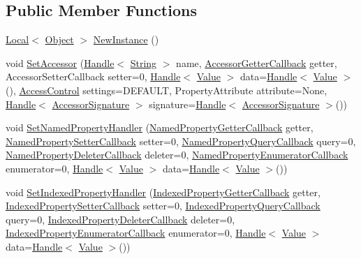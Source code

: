 \subsection*{Public Member Functions}
\begin{DoxyCompactItemize}
\item 
\hyperlink{classv8_1_1_local}{Local}$<$ \hyperlink{classv8_1_1_object}{Object} $>$ \hyperlink{classv8_1_1_object_template_ad25d8ebf37b1a3aaf7d4a03b1a9bd5c1}{New\+Instance} ()
\item 
void \hyperlink{classv8_1_1_object_template_acf245fcdedc797068a1eb4c8d46a5269}{Set\+Accessor} (\hyperlink{classv8_1_1_handle}{Handle}$<$ \hyperlink{classv8_1_1_string}{String} $>$ name, \hyperlink{namespacev8_a722613c87061708a4f1aa050d095f868}{Accessor\+Getter\+Callback} getter, Accessor\+Setter\+Callback setter=0, \hyperlink{classv8_1_1_handle}{Handle}$<$ \hyperlink{classv8_1_1_value}{Value} $>$ data=\hyperlink{classv8_1_1_handle}{Handle}$<$ \hyperlink{classv8_1_1_value}{Value} $>$(), \hyperlink{namespacev8_a31d8355cb043d7d2dda3f4a52760b64e}{Access\+Control} settings=D\+E\+F\+A\+U\+L\+T, Property\+Attribute attribute=None, \hyperlink{classv8_1_1_handle}{Handle}$<$ \hyperlink{classv8_1_1_accessor_signature}{Accessor\+Signature} $>$ signature=\hyperlink{classv8_1_1_handle}{Handle}$<$ \hyperlink{classv8_1_1_accessor_signature}{Accessor\+Signature} $>$())
\item 
void \hyperlink{classv8_1_1_object_template_ac7bcbb6e2936ab38490680f7e1bfb787}{Set\+Named\+Property\+Handler} (\hyperlink{namespacev8_a50cae386a68bf9ff23d02aa1161face4}{Named\+Property\+Getter\+Callback} getter, \hyperlink{namespacev8_a9587769513971dc7cb301b740d9e66b6}{Named\+Property\+Setter\+Callback} setter=0, \hyperlink{namespacev8_ac135beae5f0c8b290255accb438f990e}{Named\+Property\+Query\+Callback} query=0, \hyperlink{namespacev8_aaba861076c5b111912cfa0791d348437}{Named\+Property\+Deleter\+Callback} deleter=0, \hyperlink{namespacev8_a5f6f16818a9cddacadbfe6d90ca3a6b1}{Named\+Property\+Enumerator\+Callback} enumerator=0, \hyperlink{classv8_1_1_handle}{Handle}$<$ \hyperlink{classv8_1_1_value}{Value} $>$ data=\hyperlink{classv8_1_1_handle}{Handle}$<$ \hyperlink{classv8_1_1_value}{Value} $>$())
\item 
void \hyperlink{classv8_1_1_object_template_a5542f9cf400563a8c2fda448144feee1}{Set\+Indexed\+Property\+Handler} (\hyperlink{namespacev8_a48e7816ba64447bf32a25d194588daaf}{Indexed\+Property\+Getter\+Callback} getter, \hyperlink{namespacev8_a4ac7cc6185ebc8b6a199f9fa8e6bf5c3}{Indexed\+Property\+Setter\+Callback} setter=0, \hyperlink{namespacev8_a980b62c33eb664783e61e25c3b27f9ee}{Indexed\+Property\+Query\+Callback} query=0, \hyperlink{namespacev8_a53863728de14cde48dd6543207b2f2da}{Indexed\+Property\+Deleter\+Callback} deleter=0, \hyperlink{namespacev8_adbb0a6d5537371953f9ba807d4f6275e}{Indexed\+Property\+Enumerator\+Callback} enumerator=0, \hyperlink{classv8_1_1_handle}{Handle}$<$ \hyperlink{classv8_1_1_value}{Value} $>$ data=\hyperlink{classv8_1_1_handle}{Handle}$<$ \hyperlink{classv8_1_1_value}{Value} $>$())

\end{DoxyCompactItemize}
